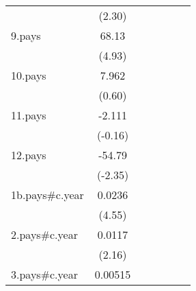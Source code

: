 {\begin{tabular}{l*{6}{c}}
                    &      (2.30)         &                     &                     &                     &                     &                     \\
[1em]
9.pays              &       68.13\sym{***}&                     &                     &                     &                     &                     \\
                    &      (4.93)         &                     &                     &                     &                     &                     \\
[1em]
10.pays             &       7.962         &                     &                     &                     &                     &                     \\
                    &      (0.60)         &                     &                     &                     &                     &                     \\
[1em]
11.pays             &      -2.111         &                     &                     &                     &                     &                     \\
                    &     (-0.16)         &                     &                     &                     &                     &                     \\
[1em]
12.pays             &      -54.79\sym{*}  &                     &                     &                     &                     &                     \\
                    &     (-2.35)         &                     &                     &                     &                     &                     \\
[1em]
1b.pays#c.year      &      0.0236\sym{***}&                     &                     &                     &                     &                     \\
                    &      (4.55)         &                     &                     &                     &                     &                     \\
[1em]
2.pays#c.year       &      0.0117\sym{*}  &                     &                     &                     &                     &                     \\
                    &      (2.16)         &                     &                     &                     &                     &                     \\
[1em]
3.pays#c.year       &     0.00515         &                     &                     &                     &                     &                     \\

\end{tabular}}
